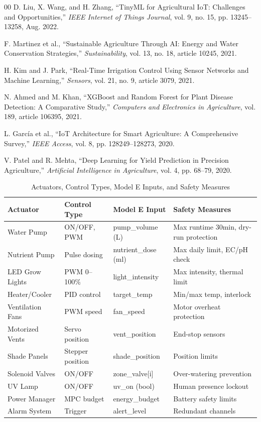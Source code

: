 \documentclass[conference]{IEEEtran}
\begin{document}
\begin{thebibliography}{00}
 D. Liu, X. Wang, and H. Zhang, ``TinyML for Agricultural IoT: Challenges and Opportunities,'' \textit{IEEE Internet of Things Journal}, vol. 9, no. 15, pp. 13245--13258, Aug. 2022.

 F. Martinez et al., ``Sustainable Agriculture Through AI: Energy and Water Conservation Strategies,'' \textit{Sustainability}, vol. 13, no. 18, article 10245, 2021.

 H. Kim and J. Park, ``Real-Time Irrigation Control Using Sensor Networks and Machine Learning,'' \textit{Sensors}, vol. 21, no. 9, article 3079, 2021.

 N. Ahmed and M. Khan, ``XGBoost and Random Forest for Plant Disease Detection: A Comparative Study,'' \textit{Computers and Electronics in Agriculture}, vol. 189, article 106395, 2021.

 L. García et al., ``IoT Architecture for Smart Agriculture: A Comprehensive Survey,'' \textit{IEEE Access}, vol. 8, pp. 128249--128273, 2020.

 V. Patel and R. Mehta, ``Deep Learning for Yield Prediction in Precision Agriculture,'' \textit{Artificial Intelligence in Agriculture}, vol. 4, pp. 68--79, 2020.

\end{thebibliography}

\begin{table}[htbp]
\caption{Actuators, Control Types, Model E Inputs, and Safety Measures}
\begin{center}
\small
\begin{tabular}{|l|l|l|p{3cm}|}
\hline
\textbf{Actuator} & \textbf{Control Type} & \textbf{Model E Input} & \textbf{Safety Measures} \\
\hline
Water Pump & ON/OFF, PWM & pump\_volume (L) & Max runtime 30min, dry-run protection \\
Nutrient Pump & Pulse dosing & nutrient\_dose (ml) & Max daily limit, EC/pH check \\
LED Grow Lights & PWM 0--100\% & light\_intensity & Max intensity, thermal limit \\
Heater/Cooler & PID control & target\_temp & Min/max temp, interlock \\
Ventilation Fans & PWM speed & fan\_speed & Motor overheat protection \\
Motorized Vents & Servo position & vent\_position & End-stop sensors \\
Shade Panels & Stepper position & shade\_position & Position limits \\
Solenoid Valves & ON/OFF & zone\_valve[i] & Over-watering prevention \\
UV Lamp & ON/OFF & uv\_on (bool) & Human presence lockout \\
Power Manager & MPC budget & energy\_budget & Battery safety limits \\
Alarm System & Trigger & alert\_level & Redundant channels \\
\hline
\end{tabular}
\label{tab:actuators}
\end{center}
\end{table}
\end{document}
